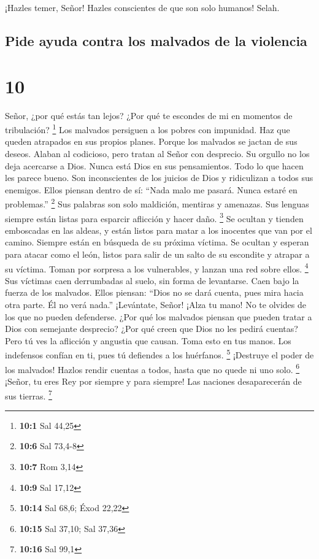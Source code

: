  ¡Hazles temer, Señor! Hazles conscientes de que son solo
humanos! Selah.

\hypertarget{pide-ayuda-contra-los-malvados-de-la-violencia}{%
\subsection{Pide ayuda contra los malvados de la
violencia}\label{pide-ayuda-contra-los-malvados-de-la-violencia}}

\hypertarget{section-9}{%
\section{10}\label{section-9}}

 Señor, ¿por qué estás tan lejos? ¿Por qué te escondes de mi
en momentos de tribulación? \footnote{\textbf{10:1} Sal 44,25}
 Los malvados persiguen a los pobres con impunidad. Haz que
queden atrapados en sus propios planes.  Porque los malvados
se jactan de sus deseos. Alaban al codicioso, pero tratan al Señor con
desprecio.  Su orgullo no los deja acercarse a Dios. Nunca
está Dios en sus pensamientos.  Todo lo que hacen les parece
bueno. Son inconscientes de los juicios de Dios y ridiculizan a todos
sus enemigos.  Ellos piensan dentro de sí: ``Nada malo me
pasará. Nunca estaré en problemas.'' \footnote{\textbf{10:6} Sal 73,4-8}
 Sus palabras son solo maldición, mentiras y amenazas. Sus
lenguas siempre están listas para esparcir aflicción y hacer daño.
\footnote{\textbf{10:7} Rom 3,14}  Se ocultan y tienden
emboscadas en las aldeas, y están listos para matar a los inocentes que
van por el camino. Siempre están en búsqueda de su próxima víctima.
 Se ocultan y esperan para atacar como el león, listos para
salir de un salto de su escondite y atrapar a su víctima. Toman por
sorpresa a los vulnerables, y lanzan una red sobre ellos. \footnote{\textbf{10:9}
  Sal 17,12}  Sus víctimas caen derrumbadas al suelo, sin
forma de levantarse. Caen bajo la fuerza de los malvados. 
Ellos piensan: ``Dios no se dará cuenta, pues mira hacia otra parte. Él
no verá nada.''  ¡Levántate, Señor! ¡Alza tu mano! No te
olvides de los que no pueden defenderse.  ¿Por qué los
malvados piensan que pueden tratar a Dios con semejante desprecio? ¿Por
qué creen que Dios no les pedirá cuentas?  Pero tú ves la
aflicción y angustia que causan. Toma esto en tus manos. Los indefensos
confían en ti, pues tú defiendes a los huérfanos. \footnote{\textbf{10:14}
  Sal 68,6; Éxod 22,22}  ¡Destruye el poder de los
malvados! Hazlos rendir cuentas a todos, hasta que no quede ni uno solo.
\footnote{\textbf{10:15} Sal 37,10; Sal 37,36}  ¡Señor, tu
eres Rey por siempre y para siempre! Las naciones desaparecerán de sus
tierras. \footnote{\textbf{10:16} Sal 99,1}

